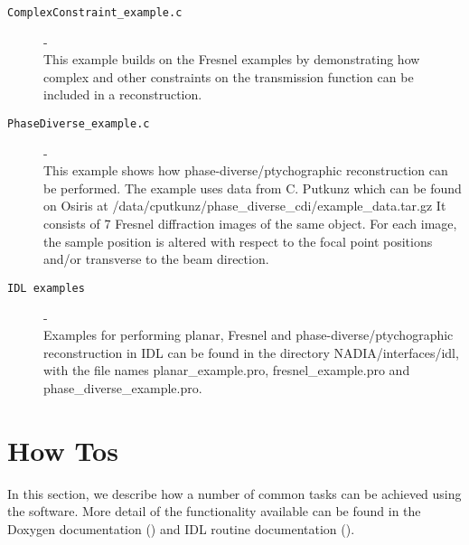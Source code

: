 \documentclass[]{nadia}
\begin{document}
\begin{description}
\item[{\tt ComplexConstraint\_example.c }]- \\ This example builds on
  the Fresnel examples by demonstrating how complex and other
  constraints on the transmission function can be included in a
  reconstruction.

\item[{\tt PhaseDiverse\_example.c }]- \\ This example shows how
  phase-diverse/ptychographic reconstruction can be performed. The
  example uses data from C. Putkunz which can be found on Osiris at
  /data/cputkunz/phase\_diverse\_cdi/example\_data.tar.gz It consists
  of 7 Fresnel diffraction images of the same object.  For each image,
  the sample position is altered with respect to the focal point
  positions and/or transverse to the beam direction.

\item[{\tt IDL examples}] - \\ Examples for performing planar, Fresnel
  and phase-diverse/ptychographic reconstruction in IDL can be found
  in the directory NADIA/interfaces/idl, with the file names
  planar\_example.pro, fresnel\_example.pro and
  phase\_diverse\_example.pro.

\end{description}


\newpage

\section{How Tos}
\label{sec:how_to}

In this section, we describe how a number of common tasks can be
achieved using the software. More detail of the functionality
available can be found in the Doxygen documentation () and IDL routine
documentation (). 
\end{document}

